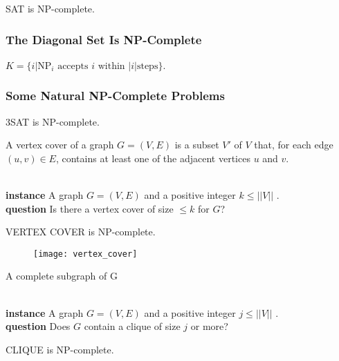  SAT is NP-complete.

\subsubsection{The Diagonal Set Is NP-Complete}

 $K = \{i | \text{NP}_i \text{ accepts } i \text{ within } |i| \text{
steps}\}$.

\subsubsection{Some Natural NP-Complete Problems}

 3SAT is NP-complete.

 A vertex cover of a graph $G = (V, E)$ is a subset $V'$ of
$V$ that, for each edge $(u, v) \in E$, contains at least one of the
adjacent vertices $u$ and $v$.

\\
\textbf{instance} A graph $G = (V, E)$ and a positive integer $k \le ||V||$ .\\
\textbf{question} Is there a vertex cover of size $\le k$ for $G$?

 VERTEX COVER is NP-complete.

\begin{figure}[H]
  \centering
  \texttt{[image: vertex\_cover]}
\end{figure}

 A complete subgraph of G

 \\
\textbf{instance} A graph $G = (V, E)$ and a positive integer $j \le ||V||$ .\\
\textbf{question} Does $G$ contain a clique of size $j$ or more?

 CLIQUE is NP-complete.
